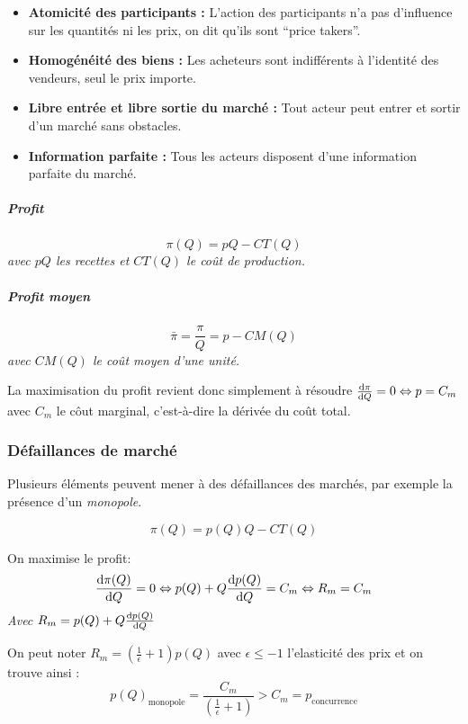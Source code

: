 \begin{itemize}[label =]
	\item \textbf{Atomicité des participants :} L'action des participants n'a pas d'influence sur les quantités ni les prix, on dit qu'ils sont ``price takers''.
	\item \textbf{Homogénéité des biens :} Les acheteurs sont indifférents à l'identité des vendeurs, seul le prix importe.
	\item \textbf{Libre entrée et libre sortie du marché :} Tout acteur peut entrer et sortir d'un marché sans obstacles.
	\item \textbf{Information parfaite :} Tous les acteurs disposent d'une information parfaite du marché.
\end{itemize}
\begin{tcolorbox}[title=Concurrence pure et parfaite]

\subparagraph{Profit} %
\label{subp:profit}

\[
	\pi(Q)= pQ-CT(Q)
\]
\emph{avec $pQ$ les recettes et $CT(Q)$ le coût de production.}

\subparagraph{Profit moyen} %
\label{subp:profit_moyen}
\[
	\bar{\pi}= \frac{\pi}{Q}= p - CM(Q)
\]
\emph{avec $CM(Q)$ le coût moyen d'une unité.}



La maximisation du profit revient donc simplement à résoudre $\frac{\operatorname{d}\! \pi}{\operatorname{d}\! Q}=0 \Leftrightarrow p=C_m$ avec $C_m$ le côut marginal, c'est-à-dire la dérivée du coût total.
\end{tcolorbox}


\subsubsection{Défaillances de marché} %
\label{sub:defaillances_de_marche}
Plusieurs éléments peuvent mener à des défaillances des marchés, 
par exemple la présence d'un \emph{monopole}.
\begin{tcolorbox}[title=Monopole]


\[
	\pi(Q)= p(Q)Q- CT(Q)
\]

On maximise le profit: 
\[
	\frac{\operatorname{d}\! \pi(Q)}{\operatorname{d}\! Q}=0 \Leftrightarrow p(Q)+ Q\frac{\operatorname{d}\! p(Q)}{\operatorname{d}\! Q}
  = C_m \Leftrightarrow R_m= C_m
\]
\emph{Avec $R_m=p(Q)+ Q\frac{\operatorname{d}\! p(Q)}{\operatorname{d}\! Q}$}

On peut noter $R_m= \left(\frac{1}{\epsilon}+1 \right)p(Q)$ avec $\epsilon \leq -1$ 
l'elasticité des prix et on trouve ainsi : 
\[
	p(Q)_{\text{monopole}}=\frac{C_m}{\left(\frac{1}{\epsilon}+1 \right)} > C_m=p_{\text{concurrence}}
\]
\end{tcolorbox}


